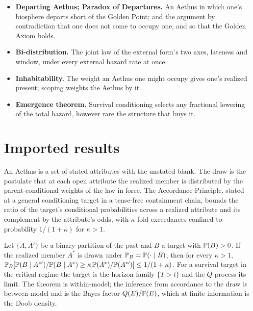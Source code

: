 \begin{itemize}[itemsep=2pt]
framework's primitives.
\item \textbf{Departing Aethus; Paradox of Departures.} An Aethus in which
one's biosphere departs short of the Golden Point; and the
argument by contradiction that one does not come to occupy one, and so
that the Golden Axiom holds.
\item \textbf{Bi-distribution.} The joint law of the external form's two
axes, lateness and window, under every external hazard rate at once.
\item \textbf{Inhabitability.} The weight an Aethus one might occupy gives
one's realized present; scoping weights the Aethus by it.
\item \textbf{Emergence theorem.} Survival conditioning selects any
fractional lowering of the total hazard, however rare the structure
that buys it.
\end{itemize}

\section{Imported results}\label{sec:imports}

\begin{definition}
\label{imp:accordance}
An Aethus is a set of stated attributes with the unstated blank. The draw
is the postulate that at each open attribute the realized member is
distributed by the parent-conditional weights of the law in force. The
Accordance Principle, stated at a general conditioning target in a
tense-free containment chain, bounds the ratio of the target's conditional
probabilities across a realized attribute and its complement by the
attribute's odds, with $\kappa$-fold exceedances confined to probability
$1/(1+\kappa)$ for $\kappa>1$.
\end{definition}

\begin{theorem}
\label{imp:targeted}
Let $\{A,A'\}$ be a binary partition of the past and $B$ a target with
$\mathbb{P}(B)>0$. If the realized member $A^\ast$ is drawn under
$\mathbb{P}_B=\mathbb{P}(\cdot\mid B)$, then for every $\kappa>1$,
$\mathbb{P}_B[\mathbb{P}(B\mid A^{\ast\prime})/\mathbb{P}(B\mid A^\ast)\ge\kappa\,\mathbb{P}(A^\ast)/\mathbb{P}(A^{\ast\prime})]\le1/(1+\kappa)$.
For a survival target in the critical regime the target is the horizon
family $\{T>t\}$ and the $Q$-process its limit. The theorem is
within-model; the inference from accordance to the draw is between-model
and is the Bayes factor $Q(E)/\mathbb{P}(E)$, which at finite information is the
Doob density.
\end{theorem}

